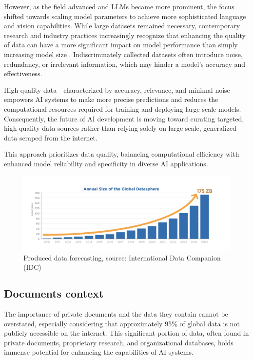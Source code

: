 However, as the field advanced and LLMs became more prominent, the focus shifted towards scaling model parameters to achieve more sophisticated language and vision capabilities. While large datasets remained necessary, contemporary research and industry practices increasingly recognize that enhancing the quality of data can have a more significant impact on model performance than simply increasing model size \cite{bigdatawire2024}. Indiscriminately collected datasets often introduce noise, redundancy, or irrelevant information, which may hinder a model’s accuracy and effectiveness.

High-quality data—characterized by accuracy, relevance, and minimal noise—empowers AI systems to make more precise predictions and reduces the computational resources required for training and deploying large-scale models. Consequently, the future of AI development is moving toward curating targeted, high-quality data sources rather than relying solely on large-scale, generalized data scraped from the internet. 

This approach prioritizes data quality, balancing computational efficiency with enhanced model reliability and specificity in diverse AI applications.


\begin{figure} [h!]
    \centering
    \includegraphics[width=0.95\linewidth]{Assets/required_data.png}
    \caption{Produced data forecasting, source: International Data Companion (IDC)}
    \label{fig:enter-label}
\end{figure}
\subsection{Documents context}
The importance of private documents and the data they contain cannot be overstated, especially considering that approximately 95\% of global data is not publicly accessible on the internet. This significant portion of data, often found in private documents, proprietary research, and organizational databases, holds immense potential for enhancing the capabilities of AI systems. 

